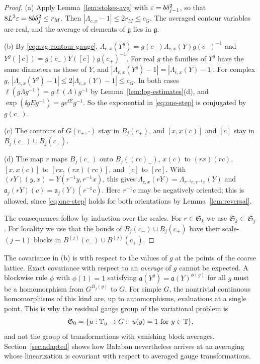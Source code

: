 \begin{proof}
(a) Apply Lemma~\ref{lem:stokes-avg} with $\varepsilon=b\delta_{j-1}^2$, so that $8L^2\varepsilon=8b\delta_j^2\le r_M$. Then $|\Lambda_{c,x}-1|\le2r_M\le c_G$. The averaged contour variables are real, and the average of elements of $\mathfrak g$ lies in $\mathfrak g$.

(b) By \eqref{eq:avg-contour-gauge}, $\Lambda_{c,x}(Y^g)=g(c_-)\Lambda_{c,x}(Y)g(c_-)^{-1}$ and $Y^g([c])=g(c_-)Y([c])g(c_+)^{-1}$. For real $g$ the families of $Y^g$ have the same diameters as those of $Y$, and $|\Lambda_{c,x}(Y^g)-1|=|\Lambda_{c,x}(Y)-1|$. For complex $g$, $|\Lambda_{c,x}(Y^g)-1|\le2|\Lambda_{c,x}(Y)-1|\le c_G$. In both cases $\ell(g\Lambda g^{-1})=g\ell(\Lambda)g^{-1}$ by Lemma~\ref{lem:log-estimates}(d), and $\exp(\ii gEg^{-1})=ge^{\ii E}g^{-1}$. So the exponential in \eqref{eq:one-step} is conjugated by $g(c_-)$.

(c) The contours of $G(c_\pm,\cdot)$ stay in $B_j(c_\pm)$, and $[x,x(c)]$ and $[c]$ stay in $B_j(c_-)\cup B_j(c_+)$.

(d) The map $r$ maps $B_j(c_-)$ onto $B_j((rc)_-)$, $x(c)$ to $(rx)(rc)$, $[x,x(c)]$ to $[rx,(rx)(rc)]$, and $[c]$ to $[rc]$. With $(rY)(y,x)=Y(r^{-1}y,r^{-1}x)$, this gives $\Lambda_{c,x}(rY)=\Lambda_{r^{-1}c,r^{-1}x}(Y)$ and $\mathfrak a_j(rY)(c)=\mathfrak a_j(Y)(r^{-1}c)$. Here $r^{-1}c$ may be negatively oriented; this is allowed, since \eqref{eq:one-step} holds for both orientations by Lemma~\ref{lem:reversal}.

The consequences follow by induction over the scales. For $r\in\mathfrak S_k$ we use $\mathfrak S_k\subset\mathfrak S_j$. For locality we use that the bonds of $B_j(c_-)\cup B_j(c_+)$ have their scale-$(j-1)$ blocks in $B^{(j)}(c_-)\cup B^{(j)}(c_+)$.
\end{proof}

The covariance in (b) is with respect to the values of $g$ at the points of the coarse lattice. Exact covariance with respect to an \emph{average} of $g$ cannot be expected. A blockwise rule $\phi$ with $\phi(1)=1$ satisfying $\mathfrak a(Y^g)=\mathfrak a(Y)^{\phi(g)}$ for all $g$ must be a homomorphism from $G^{B_j(y)}$ to $G$. For simple $G$, the nontrivial continuous homomorphisms of this kind are, up to automorphisms, evaluations at a single point. This is why the residual gauge group of the variational problem is
\[
\mathfrak G_0=\{u:\mathbb T_\eta\to G:\ u(y)=1\text{ for }y\in\mathbb T\},
\]
and not the group of transformations with vanishing block averages. Section~\ref{sec:adapted} shows how Ba\l aban nevertheless arrives at an averaging whose linearization is covariant with respect to averaged gauge transformations.

